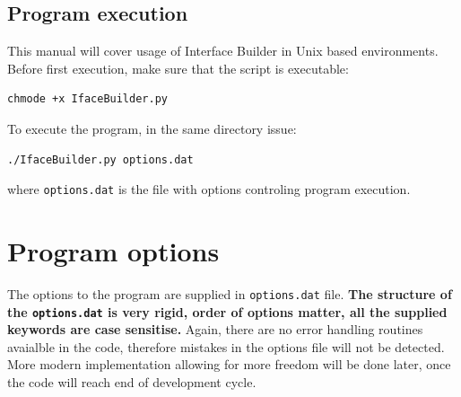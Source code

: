 \documentclass[a4paper,12pt,oneside]{article}
\begin{document}
\subsection{Program execution}
This manual will cover usage of Interface Builder in Unix based environments. 
\noindent
Before first execution, make sure that the script is executable:
\begin{verbatim}
chmode +x IfaceBuilder.py
\end{verbatim}

\noindent
To execute the program, in the same directory issue:
\begin{verbatim}
./IfaceBuilder.py options.dat
\end{verbatim}
where \texttt{options.dat} is the file with options controling program
execution.

\section{Program options}
The options to the program are supplied in \texttt{options.dat} file.
\textbf{The structure of the \texttt{options.dat} is very rigid, order of
options matter, all the supplied keywords are case sensitise.} Again, there are
no error handling routines avaialble in the code, therefore mistakes
in the
options file will not be detected. More modern
implementation allowing for more freedom will be done later, once the code will
reach end of development cycle.
\end{document}
